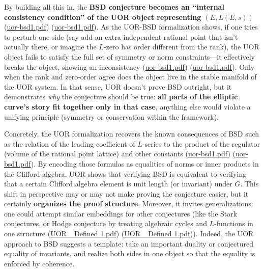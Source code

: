 \documentclass[12pt]{article}
\begin{document}
\medskip

By building all this in, the \textbf{BSD conjecture becomes an “internal consistency condition” of the UOR object representing $(E, L(E,s))$} (\href{file://file-QX2RAaHV3sY1bCttwB4hkL#:~:text=the%20coherence%20norm%20are%20,th}{uor-bsd1.pdf}) (\href{file://file-QX2RAaHV3sY1bCttwB4hkL#:~:text=is%20constrained%20by%20a%20,This}{uor-bsd1.pdf}). As the UOR-BSD formalization shows, if one tries to perturb one side (say add an extra independent rational point that isn’t actually there, or imagine the $L$-zero has order different from the rank), the UOR object fails to satisfy the full set of symmetry or norm constraints---it effectively breaks the object, showing an inconsistency (\href{file://file-QX2RAaHV3sY1bCttwB4hkL#:~:text=must%20yield%20a%20single%20coherent,This}{uor-bsd1.pdf}) (\href{file://file-QX2RAaHV3sY1bCttwB4hkL#:~:text=match%20at%20L1076%20coherence%20is,the%20norm%20consistency%2C%20hence%20is}{uor-bsd1.pdf}). Only when the rank and zero-order agree does the object live in the stable manifold of the UOR system. In that sense, UOR doesn’t prove BSD outright, but it demonstrates \emph{why} the conjecture should be true: \textbf{all parts of the elliptic curve’s story fit together only in that case}, anything else would violate a unifying principle (symmetry or conservation within the framework).

\medskip

Concretely, the UOR formalization recovers the known consequences of BSD such as the relation of the leading coefficient of $L$-series to the product of the regulator (volume of the rational point lattice) and other constants (\href{file://file-QX2RAaHV3sY1bCttwB4hkL#:~:text=by%20%24r%24%20basis%20vectors%20in,p%7CN}{uor-bsd1.pdf}) (\href{file://file-QX2RAaHV3sY1bCttwB4hkL#:~:text=leading%20coefficient%20on%20the%20analytic,Clifford%20volume%20is%20nonzero%2C%20which}{uor-bsd1.pdf}). By encoding those formulas as equalities of norms or inner products in the Clifford algebra, UOR shows that verifying BSD is equivalent to verifying that a certain Clifford algebra element is unit length (or invariant) under $G$. This shift in perspective may or may not make proving the conjecture easier, but it certainly \textbf{organizes the proof structure}. Moreover, it invites generalizations: one could attempt similar embeddings for other conjectures (like the Stark conjectures, or Hodge conjecture by treating algebraic cycles and $L$-functions in one structure (\href{file://file-XiorGa5Wu6KTrCZGytuVSc#:~:text=Beyond%20Hilbert%E2%80%93P%C3%B3lya%2C%20the%20UOR%20framework%E2%80%99s,might%20try%20to%20embed%20the}{UOR\_ Defined 1.pdf}) (\href{file://file-XiorGa5Wu6KTrCZGytuVSc#:~:text=Hilbert%E2%80%93P%C3%B3lya%20conjecture%2C%20providing%20a%20uniform,problem%20in%20spectral%20number%20theory}{UOR\_ Defined 1.pdf})). Indeed, the UOR approach to BSD suggests a template: take an important duality or conjectured equality of invariants, and realize both sides in one object so that the equality is enforced by coherence.
\end{document}

